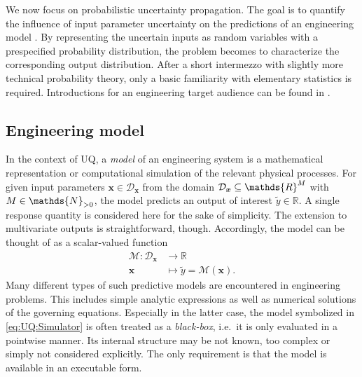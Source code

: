 We now focus on probabilistic uncertainty propagation.
The goal is to quantify the influence of input parameter uncertainty on the predictions of an engineering model \cite{Uncertainty:Lee2009,Uncertainty:Arnst2014}.
By representing the uncertain inputs as random variables with a prespecified probability distribution, the problem becomes to characterize the corresponding output distribution.
After a short intermezzo with slightly more technical probability theory, only a basic familiarity with elementary statistics is required.
Introductions for an engineering target audience can be found in \cite{Statistics:Soong2004,Statistics:Benaroya2005,Statistics:Schwarzlander2011}.

\subsection{Engineering model}
In the context of UQ, a \emph{model} of an engineering system is a mathematical representation or computational simulation of the relevant physical processes.
For given input parameters \(\bm{x} \in \mathcal{D}_{\bm{x}}\) from the domain \(\mathcal{D}_{\bm{x}} \subseteq \mathds{R}^\dimParam\) with \(\dimParam \in \mathds{N}_{>0}\),
the model predicts an output of interest \(\tilde{y} \in \mathds{R}\).
A single response quantity is considered here for the sake of simplicity.
The extension to multivariate outputs is straightforward, though.
Accordingly, the model can be thought of as a scalar-valued function
\begin{equation} \label{eq:UQ:Simulator}
  \begin{aligned}
    \mathcal{M} \colon \mathcal{D}_{\bm{x}} &\rightarrow \mathds{R} \\
    \bm{x} &\mapsto \tilde{y} = \mathcal{M}(\bm{x}).
  \end{aligned}
\end{equation}
Many different types of such predictive models are encountered in engineering problems.
This includes simple analytic expressions as well as numerical solutions of the governing equations.
Especially in the latter case, the model symbolized in \cref{eq:UQ:Simulator} is often treated as a \emph{black-box}, i.e.\ it is only evaluated in a pointwise manner.
Its internal structure may be not known, too complex or simply not considered explicitly.
The only requirement is that the model is available in an executable form.

